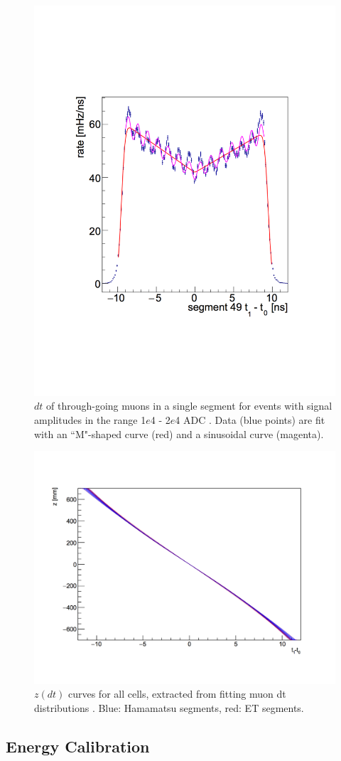 \begin{figure}
\begin{minipage}[t]{0.5\linewidth}
		\includegraphics[width=0.85\linewidth]{tex/5-analysis-images/HobbesFit}
		\caption[Muon $dt$ for a single segment]{$dt$ of through-going muons in a single segment for events with signal amplitudes in the range  1$e$4 -  2$e$4 ADC \cite{MM:2314}. Data (blue points) are fit with an ``M"-shaped curve (red) and a sinusoidal curve (magenta).}
		\label{fig:hobbesfit}
	\end{minipage}
\end{figure}

\begin{figure}[h]
	\centering
	\includegraphics[width=0.6\linewidth]{tex/5-analysis-images/z_vs_dt}
	\caption[$z(dt)$ curves for all cells]{$z(dt)$ curves for all cells, extracted from fitting muon dt distributions \cite{MM:2314}. Blue: Hamamatsu segments, red: ET segments.}
	\label{fig:zvsdt}
\end{figure}

\subsection{Energy Calibration}




